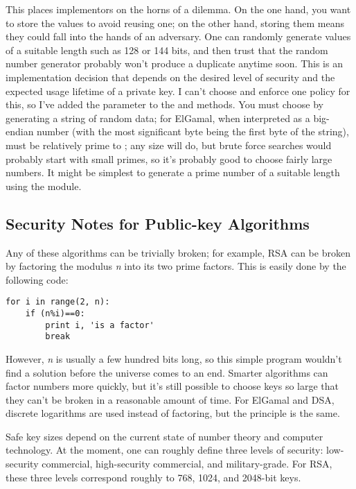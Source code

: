 \documentclass{howto}
\begin{document}
This places implementors on the horns of a dilemma.  On the one hand,
you want to store the  values to avoid reusing one; on the other
hand, storing them means they could fall into the hands of an adversary.
One can randomly generate  values of a suitable length such as
128 or 144 bits, and then trust that the random number generator
probably won't produce a duplicate anytime soon.  This is an
implementation decision that depends on the desired level of security
and the expected usage lifetime of a private key.  I can't choose and
enforce one policy for this, so I've added the  parameter to the
 and  methods.  You must choose  by
generating a string of random data; for ElGamal, when interpreted as a
big-endian number (with the most significant byte being the first byte
of the string),  must be relatively prime to ; any
size will do, but brute force searches would probably start with small
primes, so it's probably good to choose fairly large numbers.  It might be
simplest to generate a prime number of a suitable length using the
 module.


\subsection{Security Notes for Public-key Algorithms}
Any of these algorithms can be trivially broken; for example, RSA can be
broken by factoring the modulus \emph{n} into its two prime factors.
This is easily done by the following code:

\begin{verbatim}
for i in range(2, n): 
    if (n%i)==0: 
        print i, 'is a factor' 
        break
\end{verbatim}

However, \emph{n} is usually a few hundred bits long, so this simple
program wouldn't find a solution before the universe comes to an end.
Smarter algorithms can factor numbers more quickly, but it's still
possible to choose keys so large that they can't be broken in a
reasonable amount of time.  For ElGamal and DSA, discrete logarithms are
used instead of factoring, but the principle is the same.

Safe key sizes depend on the current state of number theory and
computer technology.  At the moment, one can roughly define three
levels of security: low-security commercial, high-security commercial,
and military-grade.  For RSA, these three levels correspond roughly to
768, 1024, and 2048-bit keys.
\end{document}

